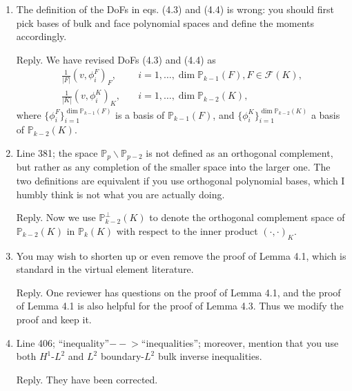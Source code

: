 \documentclass[10pt]{amsart}
\theoremstyle{definition}
\theoremstyle{remark}
\begin{document}
\begin{enumerate}[1.]
\medskip

\item \textsf{The definition of the DoFs in eqs. (4.3) and (4.4) is wrong: you should first pick bases of bulk and face polynomial spaces and define the moments accordingly.}

\smallskip \noindent \textcolor[rgb]{1.00,0.00,0.00}{Reply.}
We have revised DoFs (4.3) and (4.4) as
\begin{align*}
\frac{1}{|F|}(v, \phi_i^F)_F, & \quad i=1,\ldots, \dim\mathbb P_{k-1}(F), F\in\mathcal F(K), 
\\
\frac{1}{|K|}(v, \phi_i^K)_K, & \quad i=1,\ldots, \dim\mathbb P_{k-2}(K),
\end{align*}
where $\{\phi_i^F\}_{i=1}^{\dim\mathbb P_{k-1}(F)}$ is a basis of $\mathbb P_{k-1}(F)$, and $\{\phi_i^K\}_{i=1}^{\dim\mathbb P_{k-2}(K)}$ a basis of $\mathbb P_{k-2}(K)$.

\medskip

\item \textsf{Line 381; the space $\mathbb P_p\backslash\mathbb P_{p-2}$ is not defined as an orthogonal complement, but rather as any completion of the smaller space into the larger one. The two definitions are equivalent if you use orthogonal polynomial bases, which I humbly think is not what you are actually doing.}

\smallskip \noindent \textcolor[rgb]{1.00,0.00,0.00}{Reply.}
Now we use $\mathbb P_{k-2}^{\perp}(K)$ to denote the orthogonal complement space of $\mathbb P_{k-2}(K)$ in $\mathbb P_{k}(K)$ with respect to the inner product $(\cdot, \cdot)_K$.

\medskip

\item \textsf{You may wish to shorten up or even remove the proof of Lemma 4.1, which is standard in the virtual element literature.}

\smallskip \noindent \textcolor[rgb]{1.00,0.00,0.00}{Reply.}
One reviewer has questions on the proof of Lemma 4.1, and the proof of Lemma 4.1 is also helpful for the proof of Lemma 4.3. Thus we modify the proof and keep it.


\medskip

\item \textsf{Line 406; “inequality”$-\!\!\!-\!\!\!>$“inequalities”; moreover, mention that you use both $H^1$-$L^2$ and $L^2$ boundary-$L^2$ bulk inverse inequalities.}

\smallskip \noindent \textcolor[rgb]{1.00,0.00,0.00}{Reply.}
They have been corrected.


\end{enumerate}
\end{document}
